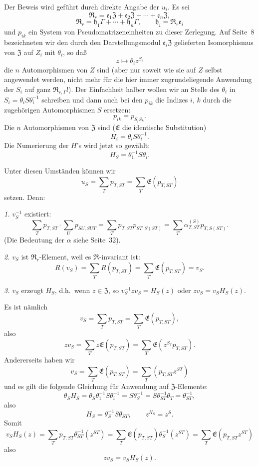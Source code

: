 \documentclass[12pt,a4paper]{article}
\theoremstyle{plain}
\theoremstyle{definition}
\theoremstyle{remark}
\begin{document}
Der Beweis wird gef\"uhrt durch direkte Angabe der $u_{i}$. Es sei
\[
\mathfrak{R}_{r} = \mathfrak{e}_{1}\mathfrak{Z} + \mathfrak{e}_{2}\mathfrak{Z} + \cdots + \mathfrak{e}_{n}\mathfrak{Z},
\]
\[
\mathfrak{R}_{r} = \mathfrak{h}_{1}\varGamma + \cdots + \mathfrak{h}_{n}\varGamma, \qquad
\mathfrak{h}_{i} = \mathfrak{R}_{r}\mathfrak{e}_{i}
\]
und $p_{ik}$ ein System von Pseudomatrizeneinheiten zu dieser Zerlegung.
Auf Seite~8 bezeichneten wir den durch den Darstellungsmodul
$\mathfrak{e}_{i}\mathfrak{Z}$ gelieferten Isomorphismus von $\mathfrak{Z}$ auf $Z_{i}$ mit $\theta_{i}$, so da\ss
\[
z \mapsto \theta_{i}z^{S_{i}}
\]
die $n$ Automorphismen von $Z$ sind (aber nur soweit wie sie auf $Z$
selbst angewendet werden, nicht mehr f\"ur die hier immer zugrundeliegende
Anwendung der $S_{i}$ auf ganz $\mathfrak{R}_{r,\varGamma}$!). Der Einfachheit halber wollen
wir an Stelle des $\theta_{i}$ in $S_{i} = \theta_{i}S\theta_{i}^{-1}$ schreiben und dann auch
bei den $p_{ik}$ die Indizes $i$, $k$ durch die zugeh\"origen Automorphismen
$S$ ersetzen:
\[
p_{ik} = p_{S_{i}S_{k}}.
\]
Die $n$ Automorphismen von $\mathfrak{Z}$ sind ($\mathfrak{E}$ die identische Substitution)
\[
H_{i} = \theta_{i}S\theta_{i}^{-1}.
\]
Die Numerierung der $H$'s wird jetzt so gew\"ahlt:
\[
H_{S} = \theta_{1}^{-1}S\theta_{i}.
\]

Unter diesen Umst\"anden k\"onnen wir
\[
u_{S} = \sum_{T}p_{T,ST} = \sum_{T}\mathfrak{E}(p_{T,ST})
\]
setzen. Denn:

\textit{1.} $v_{S}^{-1}$ existiert:
\[
\sum_{T}p_{T,ST} \cdot \sum_{U}p_{SU,SUT}
= \sum_{T}p_{T,ST}p_{ST,S(ST)}
= \sum_{T}\alpha_{T,ST}^{(S)}p_{T,S(ST)}.
\]
(Die Bedeutung der $\alpha$ siehe Seite~32).

\textit{2.} $v_{S}$ ist $\mathfrak{R}_{r}$-Element, weil es $\mathfrak{R}$-invariant ist:
\[
R(v_{S}) = \sum_{T}R(p_{T,ST}) = \sum_{T}\mathfrak{E}(p_{T,ST}) = v_{S}.
\]

\textit{3.} $v_{S}$ erzeugt $H_{S}$, d.h.\ wenn $z \in \mathfrak{Z}$, so $v_{S}^{-1}zv_{S} = H_{S}(z)$ oder
$zv_{S} = v_{S}H_{S}(z)$.

Es ist n\"amlich
\[
v_{S} = \sum_{T}p_{T,ST} = \sum_{T}\mathfrak{E}(p_{T,ST}),
\]
also
\[
zv_{S} = \sum_{T}z\mathfrak{E}(p_{T,ST}) = \sum_{T}\mathfrak{E}(z^{S_{T}}p_{T,ST}).
\]
Andererseits haben wir
\[
v_{S} = \sum_{T}\mathfrak{E}(p_{T,ST}) = \sum_{T}(p_{T,ST}z^{ST})
\]
und es gilt die folgende Gleichung f\"ur Anwendung auf $\mathfrak{Z}$-Elemente:
\[
\theta_{S}H_{S} = \theta_{S}\theta_{1}^{-1}S\theta_{i}^{-1} = S\theta_{S}^{-1}
= S\theta_{ST}^{-1}\theta_{T} = \theta_{ST}^{-1},
\]
also
\[
H_{S} = \theta_{S}^{-1}S\theta_{ST}, \qquad z^{H_{S}} = z^{S}.
\]
Somit
\[
v_{S}H_{S}(z) = \sum_{T}p_{T,ST}\theta_{ST}^{-1}(z^{ST})
= \sum_{T}\mathfrak{E}(p_{T,ST})\theta_{S}^{-1}(z^{ST})
= \sum_{T}\mathfrak{E}(p_{T,ST}z^{ST})
\]
also
\[
zv_{S} = v_{S}H_{S}(z).
\]
\end{document}
